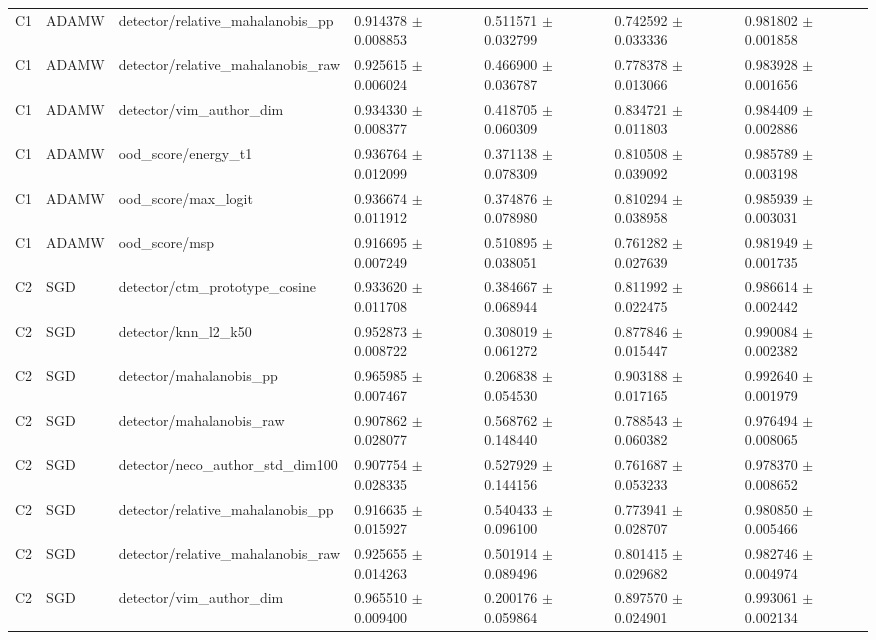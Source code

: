 \begin{longtable}{lllllll}
C1 & ADAMW & detector/relative\_mahalanobis\_pp & 0.914378 $\pm$ 0.008853 & 0.511571 $\pm$ 0.032799 & 0.742592 $\pm$ 0.033336 & 0.981802 $\pm$ 0.001858 \\
C1 & ADAMW & detector/relative\_mahalanobis\_raw & 0.925615 $\pm$ 0.006024 & 0.466900 $\pm$ 0.036787 & 0.778378 $\pm$ 0.013066 & 0.983928 $\pm$ 0.001656 \\
C1 & ADAMW & detector/vim\_author\_dim & 0.934330 $\pm$ 0.008377 & 0.418705 $\pm$ 0.060309 & 0.834721 $\pm$ 0.011803 & 0.984409 $\pm$ 0.002886 \\
C1 & ADAMW & ood\_score/energy\_t1 & 0.936764 $\pm$ 0.012099 & 0.371138 $\pm$ 0.078309 & 0.810508 $\pm$ 0.039092 & 0.985789 $\pm$ 0.003198 \\
C1 & ADAMW & ood\_score/max\_logit & 0.936674 $\pm$ 0.011912 & 0.374876 $\pm$ 0.078980 & 0.810294 $\pm$ 0.038958 & 0.985939 $\pm$ 0.003031 \\
C1 & ADAMW & ood\_score/msp & 0.916695 $\pm$ 0.007249 & 0.510895 $\pm$ 0.038051 & 0.761282 $\pm$ 0.027639 & 0.981949 $\pm$ 0.001735 \\
C2 & SGD & detector/ctm\_prototype\_cosine & 0.933620 $\pm$ 0.011708 & 0.384667 $\pm$ 0.068944 & 0.811992 $\pm$ 0.022475 & 0.986614 $\pm$ 0.002442 \\
C2 & SGD & detector/knn\_l2\_k50 & 0.952873 $\pm$ 0.008722 & 0.308019 $\pm$ 0.061272 & 0.877846 $\pm$ 0.015447 & 0.990084 $\pm$ 0.002382 \\
C2 & SGD & detector/mahalanobis\_pp & 0.965985 $\pm$ 0.007467 & 0.206838 $\pm$ 0.054530 & 0.903188 $\pm$ 0.017165 & 0.992640 $\pm$ 0.001979 \\
C2 & SGD & detector/mahalanobis\_raw & 0.907862 $\pm$ 0.028077 & 0.568762 $\pm$ 0.148440 & 0.788543 $\pm$ 0.060382 & 0.976494 $\pm$ 0.008065 \\
C2 & SGD & detector/neco\_author\_std\_dim100 & 0.907754 $\pm$ 0.028335 & 0.527929 $\pm$ 0.144156 & 0.761687 $\pm$ 0.053233 & 0.978370 $\pm$ 0.008652 \\
C2 & SGD & detector/relative\_mahalanobis\_pp & 0.916635 $\pm$ 0.015927 & 0.540433 $\pm$ 0.096100 & 0.773941 $\pm$ 0.028707 & 0.980850 $\pm$ 0.005466 \\
C2 & SGD & detector/relative\_mahalanobis\_raw & 0.925655 $\pm$ 0.014263 & 0.501914 $\pm$ 0.089496 & 0.801415 $\pm$ 0.029682 & 0.982746 $\pm$ 0.004974 \\
C2 & SGD & detector/vim\_author\_dim & 0.965510 $\pm$ 0.009400 & 0.200176 $\pm$ 0.059864 & 0.897570 $\pm$ 0.024901 & 0.993061 $\pm$ 0.002134 \\

\end{longtable}
